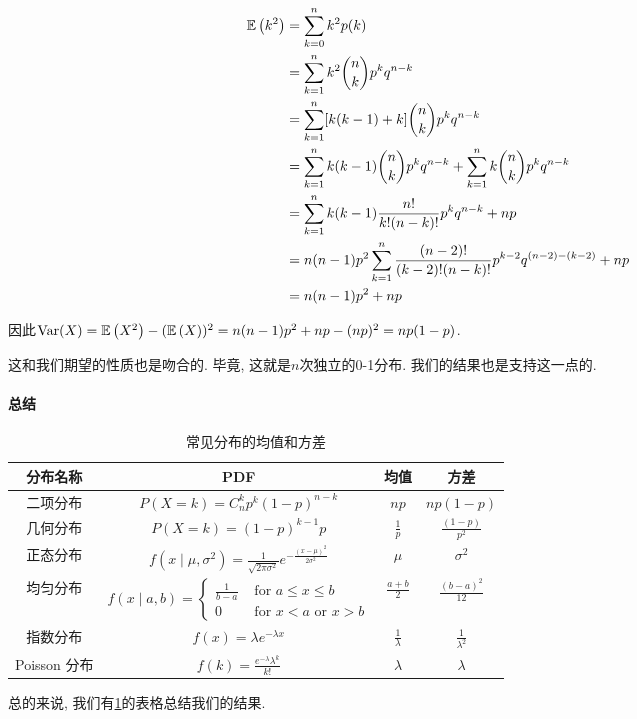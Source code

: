 $$\begin{aligned} \mathbb E\left(k^2\right) & =\sum_{k=0}^n k^2 p(k) \\ & =\sum_{k=1}^n k^2\binom n k p^k q^{n-k} \\ & =\sum_{k=1}^n[{k}({k}-1)+{k}]\binom n k p^k q^{n-k} \\ & =\sum_{k=1}^n k(k-1)\binom n k p^k q^{n-k}+\sum_{k=1}^n k\binom n k p^k q^{n-k} \\ & =\sum_{k=1}^n k(k-1) \frac{n !}{k !(n-k) !} p^k q^{n-k}+n p \\ & =n(n-1) p^2 \sum_{k=1}^n \frac{(n-2) !}{(k-2) !(n-k) !} p^{k-2} q^{(n-2)-(k-2)}+n p \\ & =n(n-1) p^2+n p\end{aligned}$$

因此$\operatorname{Var} (X)=\mathbb E\left(X^2\right)-(\mathbb E\left(X\right))^2=n(n-1) p^2+n p-(n p)^2=n p(1-p)$. 

这和我们期望的性质也是吻合的. 毕竟, 这就是$n$次独立的0-1分布. 我们的结果也是支持这一点的. 


\paragraph{总结}

\begin{table}
    \begin{tabular}{|c|c|c|c|}
        \hline 分布名称 & PDF & 均值 & 方差 \\
        \hline 二项分布 & $P(X=k)=C_n^kp^k(1-p)^{n-k}$ & $n p$ & $n p(1-p)$ \\
        \hline 几何分布 & $P(X=k)=(1-p)^{k-1} p$ & $\frac{1}{p}$ & $\frac{(1-p)}{p^2}$ \\
        \hline 正态分布 & $f\left(x \mid \mu, \sigma^2\right)=\frac{1}{\sqrt{2 \pi \sigma^2}} e^{-\frac{(x-\mu)^2}{2 \sigma^2}}$ & $\mu$ & $\sigma^2$ \\
        \hline 均匀分布 & $f(x \mid a, b)= \begin{cases}\frac{1}{b-a} & \text { for } a \leq x \leq b \\
            0 & \text { for } x<a \text { or } x>b\end{cases}$ & $\frac{a+b}{2}$ & $\frac{(b-a)^2}{12}$ \\
            \hline 指数分布 & $f(x )=\lambda e^{-\lambda x}$ & $\frac{1}{\lambda}$ & $\frac{1}{\lambda^2}$ \\
            \hline Poisson 分布 & $f(k )=\frac{e^{-\lambda} \lambda^k}{k !}$ & $\lambda$ & $\lambda$ \\
            \hline
        \end{tabular}
        \caption{常见分布的均值和方差}
        \label{table:mean-var}
\end{table}
总的来说, 我们有\cref{table:mean-var}的表格总结我们的结果. 


